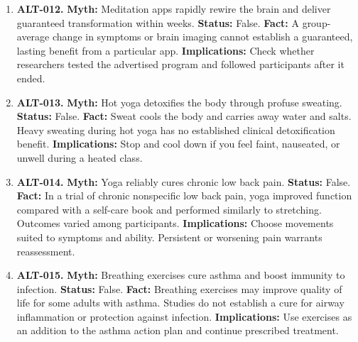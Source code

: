 \documentclass[11pt,oneside]{book}
\begin{document}
\begin{enumerate}[leftmargin=0pt,labelwidth=0pt,labelsep=0pt,itemindent=0pt]
\textbf{Implications:} If symptoms worsen repeatedly, pause or modify the practice and discuss the experience with a qualified instructor or clinician.
\item[] \textbf{ALT-012.} \textbf{Myth:} Meditation apps rapidly rewire the brain and deliver guaranteed transformation within weeks.\newline
\textbf{Status:} False.\newline
\textbf{Fact:} A group-average change in symptoms or brain imaging cannot establish a guaranteed, lasting benefit from a particular app. \cite{ref136,ref470}\newline
\textbf{Implications:} Check whether researchers tested the advertised program and followed participants after it ended.
\item[] \textbf{ALT-013.} \textbf{Myth:} Hot yoga detoxifies the body through profuse sweating.\newline
\textbf{Status:} False.\newline
\textbf{Fact:} Sweat cools the body and carries away water and salts. Heavy sweating during hot yoga has no established clinical detoxification benefit. \cite{ref303}\newline
\textbf{Implications:} Stop and cool down if you feel faint, nauseated, or unwell during a heated class.
\item[] \textbf{ALT-014.} \textbf{Myth:} Yoga reliably cures chronic low back pain.\newline
\textbf{Status:} False.\newline
\textbf{Fact:} In a trial of chronic nonspecific low back pain, yoga improved function compared with a self-care book and performed similarly to stretching. Outcomes varied among participants. \cite{ref135}\newline
\textbf{Implications:} Choose movements suited to symptoms and ability. Persistent or worsening pain warrants reassessment.
\item[] \textbf{ALT-015.} \textbf{Myth:} Breathing exercises cure asthma and boost immunity to infection.\newline
\textbf{Status:} False.\newline
\textbf{Fact:} Breathing exercises may improve quality of life for some adults with asthma. Studies do not establish a cure for airway inflammation or protection against infection. \cite{ref288,ref179}\newline
\textbf{Implications:} Use exercises as an addition to the asthma action plan and continue prescribed treatment.

\end{enumerate}
\end{document}
